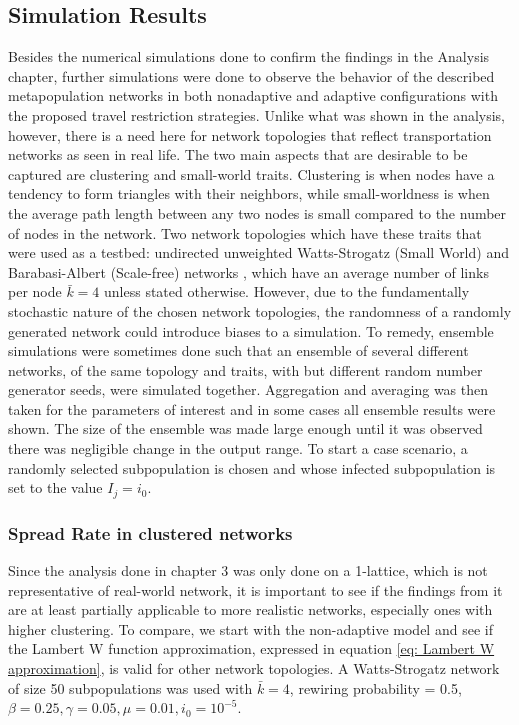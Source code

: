 \clearpage
\subsection{Simulation Results}

Besides the numerical simulations done to confirm the findings in the Analysis chapter, further simulations were done to observe the behavior of the described metapopulation networks in both nonadaptive and adaptive configurations with the proposed travel restriction strategies. Unlike what was shown in the analysis, however, there is a need here for network topologies that reflect transportation networks as seen in real life. The two main aspects that are desirable to be captured are clustering and small-world traits. Clustering is when nodes have a tendency to form triangles with their neighbors, while small-worldness is when the average path length between any two nodes is small compared to the number of nodes in the network. Two network topologies which have these traits that were used as a testbed: undirected unweighted Watts-Strogatz (Small World) and Barabasi-Albert (Scale-free) networks %
, which have an average number of links per node $\bar k=4$ unless stated otherwise. However, due to the fundamentally stochastic nature of the chosen network topologies, the randomness of a randomly generated network could introduce biases to a simulation. To remedy, ensemble simulations were sometimes done such that an ensemble of several different networks, of the same topology and traits, with but different random number generator seeds, were simulated together. Aggregation and averaging was then taken for the parameters of interest and in some cases all ensemble results were shown. The size of the ensemble was made large enough until it was observed there was negligible change in the output range. To start a case scenario, a randomly selected subpopulation is chosen and whose infected subpopulation is set to the value $I_j=i_0$.\\ 


\subsubsection{Spread Rate in clustered networks}
Since the analysis done in chapter 3 was only done on a 1-lattice, which is not representative of real-world network, it is important to see if the findings from it are at least partially applicable to more realistic networks, especially ones with higher clustering. To compare, we start with the non-adaptive model and see if the Lambert W function approximation, expressed in equation \ref{eq: Lambert W approximation}, is valid for other network topologies. A Watts-Strogatz network of size 50 subpopulations was used with $\bar k=4$, rewiring probability = 0.5, $\beta=0.25,\gamma=0.05,\mu=0.01,i_0=10^{-5}$.\\


